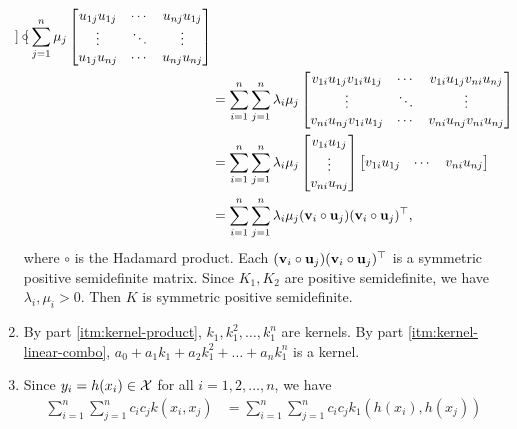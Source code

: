 \begin{enumerate}
\begin{align*}
\begin{bmatrix}
        \end{bmatrix} \circ
        \sum_{j=1}^{n} \mu_{j}
        \begin{bmatrix}
            u_{1j} u_{1j} & \cdots & u_{nj} u_{1j} \\
            \vdots & \ddots & \vdots\\
            u_{1j} u_{nj} & \cdots & u_{nj} u_{nj}\\
        \end{bmatrix}\\
        &= \sum_{i=1}^{n} \sum_{j=1}^{n} \lambda_{i} \mu_{j}
        \begin{bmatrix}
            v_{1i} u_{1j} v_{1i} u_{1j} & \cdots & v_{1i} u_{1j} v_{ni} u_{nj} \\
            \vdots & \ddots & \vdots\\
            v_{ni} u_{nj} v_{1i} u_{1j} & \cdots & v_{ni} u_{nj} v_{ni}  u_{nj}
        \end{bmatrix}\\
        &= \sum_{i=1}^{n} \sum_{j=1}^{n} \lambda_{i} \mu_{j}
        \begin{bmatrix}
            v_{1i} u_{1j} \\ \vdots \\ v_{ni} u_{nj}
        \end{bmatrix}
        \begin{bmatrix}
            v_{1i} u_{1j} & \cdots & v_{ni} u_{nj}
        \end{bmatrix}\\
        &= \sum_{i=1}^{n} \sum_{j=1}^{n} \lambda_{i} \mu_{j}
        (\mathbf{v}_i \circ \mathbf{u}_j) (\mathbf{v}_i \circ \mathbf{u}_j)^\top,
    \end{align*}
    where \(\circ\) is the Hadamard product.
    Each \((\mathbf{v}_i \circ \mathbf{u}_j) (\mathbf{v}_i \circ \mathbf{u}_j)^\top\) is a symmetric positive semidefinite matrix.
    Since \(K_1, K_2\) are positive semidefinite, we have \(\lambda_i, \mu_i > 0\).
    Then \(K\) is symmetric positive semidefinite.
    \item By part \ref{itm:kernel-product}, \(k_1, k_1^2, \dots, k_1^n\) are kernels.
    By part \ref{itm:kernel-linear-combo}, \(a_0 + a_1 k_1 + a_2 k_1^2 + \dots + a_n k_1^n\) is a kernel.
    \item Since \(y_i = h(x_i) \in \mathcal{X}\) for all \(i = 1,2,\dots, n\), we have
    \begin{align*}
        \sum_{i=1}^{n} \sum_{j=1}^{n} c_i c_j k(x_i,x_j)
        &= \sum_{i=1}^{n} \sum_{j=1}^{n} c_i c_j k_1(h(x_i), h(x_j))\\

\end{align*}
\end{enumerate}
